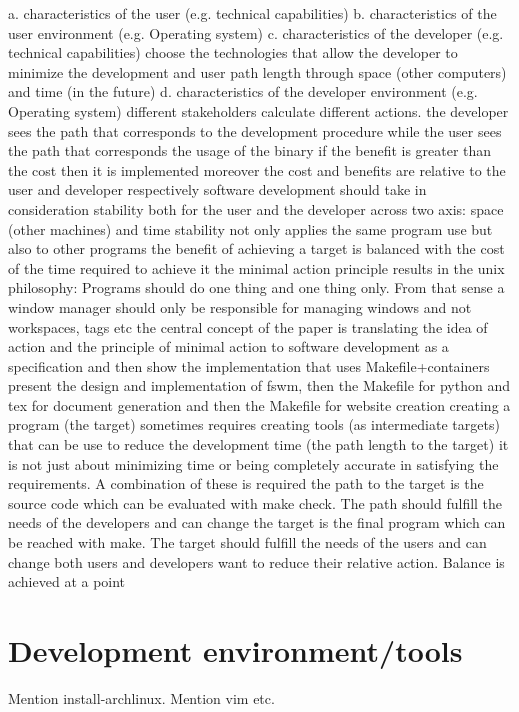 \documentclass[journal]{IEEEtran}
\begin{document}
a. characteristics of the user (e.g. technical capabilities)
b. characteristics of the user environment (e.g. Operating system)
c. characteristics of the developer (e.g. technical capabilities)
choose the technologies that allow the developer to minimize the development and user path length through space (other computers) and time (in the future)
d. characteristics of the developer environment (e.g. Operating system)
different stakeholders calculate different actions. the developer sees the path that corresponds to the development procedure while the user sees the path that corresponds the usage of the binary
if the benefit is greater than the cost then it is implemented
moreover the cost and benefits are relative to the user and developer respectively
software development should take in consideration stability both for the user and the developer across two axis: space (other machines) and time
stability not only applies the same program use but also to other programs
the benefit of achieving a target is balanced with the cost of the time required to achieve it
the minimal action principle results in the unix philosophy: Programs should do one thing and one thing only. From that sense a window manager should only be responsible for managing windows and not workspaces, tags etc
the central concept of the paper is translating the idea of action and the principle of minimal action to software development as a specification and then show the implementation that uses Makefile+containers
present the design and implementation of fswm, then the Makefile for python and tex for document generation and then the Makefile for website creation
creating a program (the target) sometimes requires creating tools (as intermediate targets) that can be use to reduce the development time (the path length to the target)
it is not just about minimizing time or being completely accurate in satisfying the requirements. A combination of these is required
the path to the target is the source code which can be evaluated with make check. The path should fulfill the needs of the developers and can change
the target is the final program which can be reached with make. The target should fulfill the needs of the users and can change
both users and developers want to reduce their relative action. Balance is achieved at a point

\section{Development environment/tools}
Mention install-archlinux.
Mention vim etc.
\end{document}
